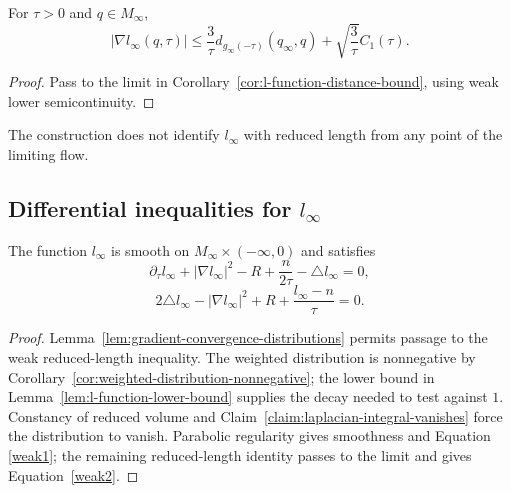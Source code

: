 \begin{corollary}\label{cor:l-infinity-gradient-bound}
\label{linfest}
For $\tau>0$ and $q\in M_\infty$,
\[
 |\nabla l_\infty(q,\tau)|\leq
 \frac3\tau d_{g_\infty(-\tau)}(q_\infty,q)
 +\sqrt{\frac3\tau}C_1(\tau).
\]
\end{corollary}
\begin{proof}
\sketch Pass to the limit in
Corollary~\ref{cor:l-function-distance-bound}, using weak lower
semicontinuity.
\end{proof}

\begin{remark}\label{rem:l-infinity-not-reduced-length}
The construction does not identify $l_\infty$ with reduced length
from any point of the limiting flow.
\end{remark}

\subsection{Differential inequalities for $l_\infty$}

\begin{proposition}\label{prop:l-infinity-differential-equations}
\label{weakeqn}
The function $l_\infty$ is smooth on
$M_\infty\times(-\infty,0)$ and satisfies
\begin{equation}\label{weak1}
 \partial_\tau l_\infty+|\nabla l_\infty|^2-R
 +\frac n{2\tau}-\triangle l_\infty=0,
\end{equation}
\begin{equation}\label{weak2}
 2\triangle l_\infty-|\nabla l_\infty|^2+R
 +\frac{l_\infty-n}{\tau}=0.
\end{equation}
\end{proposition}
\begin{proof}
\sketch Lemma~\ref{lem:gradient-convergence-distributions} permits
passage to the weak reduced-length inequality. The weighted
distribution is nonnegative by
Corollary~\ref{cor:weighted-distribution-nonnegative}; the lower
bound in Lemma~\ref{lem:l-function-lower-bound} supplies the decay
needed to test against $1$. Constancy of reduced volume and
Claim~\ref{claim:laplacian-integral-vanishes} force the distribution
to vanish. Parabolic regularity gives smoothness and Equation
\ref{weak1}; the remaining reduced-length identity passes to the
limit and gives Equation~\ref{weak2}.
\end{proof}

